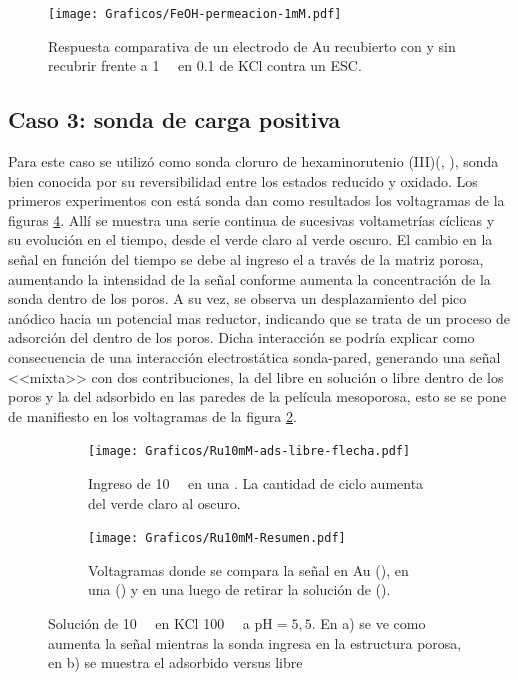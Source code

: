 		\begin{figure}[ht]
				\centering
		 	    \texttt{[image: Graficos/FeOH-permeacion-1mM.pdf]}
		        \caption[Permeación ferroceno metanol en \pdmF]{Respuesta comparativa de un electrodo de Au recubierto con \pdmF\space y sin recubrir frente a \fc\space \SI{1}{\milli\Molar} en \SI{0.1}{\Molar} de KCl contra un ESC.}
		        \label{fig:permeacion}
		      	\end{figure}

	\subsection{Caso 3: sonda de carga positiva}

		Para este caso se utilizó como sonda cloruro de hexaminorutenio (III)\linebreak (\aminorutenioCompleto, \ru), sonda bien conocida por su reversibilidad entre los estados reducido y oxidado. Los primeros experimentos con está sonda dan como resultados los voltagramas de la figuras \ref{fig:primero-Ru10mM}. Allí se muestra una serie continua de sucesivas voltametrías cíclicas y su evolución en el tiempo, desde el verde claro al verde oscuro. El cambio en la señal en función del tiempo se debe al ingreso el \ru\space a través de la matriz porosa, aumentando la intensidad de la señal conforme aumenta la concentración de la sonda dentro de los poros. A su vez, se observa un desplazamiento del pico anódico hacia un potencial mas reductor, indicando que se trata de un proceso de adsorción del \ru\space dentro de los poros. Dicha interacción se podría explicar como consecuencia de una interacción electrostática sonda-pared, generando una señal <<mixta>> con dos contribuciones, la del \ru\space libre en solución o libre dentro de los poros y la del adsorbido en las paredes de la película mesoporosa, esto se se pone de manifiesto en los voltagramas de la figura \ref{fig:Ru10mM_ingreso}.

			\begin{figure}[th]
				\begin{subfigure}[t]{0.495\textwidth}
				\texttt{[image: Graficos/Ru10mM-ads-libre-flecha.pdf]}
		        \caption{Ingreso de \ru\space \SI{10}{\milli\Molar} en una \pdmF. La cantidad de ciclo aumenta del verde claro al oscuro.}
		        \label{fig:Ru10mM_ingreso}
		      	\end{subfigure}
		      	\begin{subfigure}[t]{0.495\textwidth}
				\texttt{[image: Graficos/Ru10mM-Resumen.pdf]}
		        \caption{Voltagramas donde se compara la señal en Au (\usebox{\rojo}), en una \pdmF\space(\usebox{\verde}) y en una \pdmF\space luego de retirar la solución de \ru (\usebox{\azul}).}
		        \label{fig:Ru10mM-resumen}
		      	\end{subfigure}
		      	\caption[Adsorción de sonda positiva en \pdmF]{Solución de \ru\space \SI{10}{\milli\Molar} en KCl \SI{100}{\milli\Molar} a $\text{pH}=5,5$. En a) se ve como aumenta la señal mientras la sonda ingresa en la estructura porosa, en b) se muestra el adsorbido versus libre}
		      	\label{fig:primero-Ru10mM}
		      	\end{figure}

